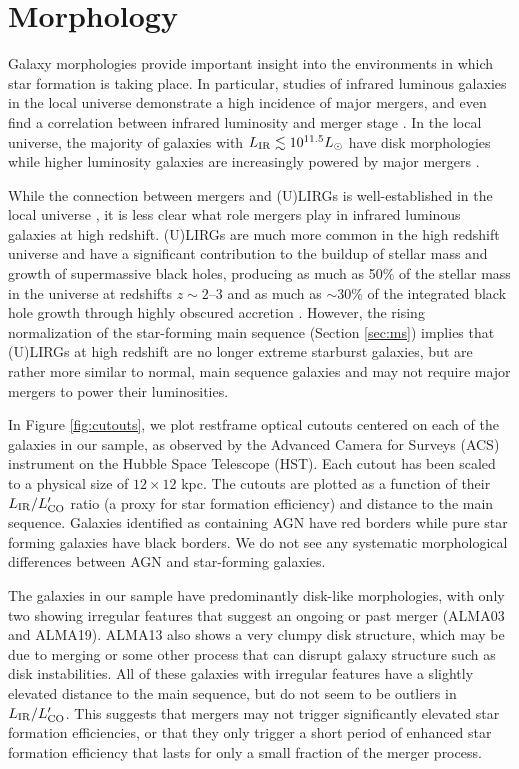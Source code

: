 \documentclass[a4paper,fleqn,usenatbib]{mnras}
\newcommand{\lir}{L_{\rm{IR}}}
\newcommand{\lco}{L'_{\rm{CO}}}
\begin{document}
\section{Morphology}\label{sec:morph}

Galaxy morphologies provide important insight into the environments in which star formation is taking place. In particular, studies of infrared luminous galaxies in the local universe demonstrate a high incidence of major mergers, and even find a correlation between infrared luminosity and merger stage \citep{2002ApJS..143..315V,2004PhDT........18I}. In the local universe, the majority of galaxies with $L_{\rm{IR}} \lesssim 10^{11.5} L_{\odot}$ have disk morphologies while higher luminosity galaxies are increasingly powered by major mergers \citep[e.g.][]{2010ApJ...721...98K,2011AJ....141..100H,2016ApJ...825..128L}.

While the connection between mergers and (U)LIRGs is well-established in the local universe \citep[e.g.][]{1996ARA&A..34..749S}, it is less clear what role mergers play in infrared luminous galaxies at high redshift. (U)LIRGs are much more common in the high redshift universe and have a significant contribution to the buildup of stellar mass and growth of supermassive black holes, producing as much as 50\% of the stellar mass in the universe at redshifts $z \sim 2$--3 \citep{2005ApJ...622..772C,2005ApJ...632..169L,2012ApJ...761..140C} and as much as $\sim 30$\% of the integrated black hole growth through highly obscured accretion \citep{2009ApJ...706..535T,2010ApJ...722L.238T}. However, the rising normalization of the star-forming main sequence (Section \ref{sec:ms}) implies that (U)LIRGs at high redshift are no longer extreme starburst galaxies, but are rather more similar to normal, main sequence galaxies and may not require major mergers to power their luminosities. 

In Figure \ref{fig:cutouts}, we plot restframe optical cutouts centered on each of the galaxies in our sample, as observed by the Advanced Camera for Surveys (ACS) instrument on the Hubble Space Telescope (HST). Each cutout has been scaled to a physical size of $12 \times 12$ kpc. The cutouts are plotted as a function of their $\lir / \lco$ ratio (a proxy for star formation efficiency) and distance to the main sequence. Galaxies identified as containing AGN have red borders while pure star forming galaxies have black borders. We do not see any systematic morphological differences between AGN and star-forming galaxies. 

The galaxies in our sample have predominantly disk-like morphologies, with only two showing irregular features that suggest an ongoing or past merger (ALMA03 and ALMA19). ALMA13 also shows a very clumpy disk structure, which may be due to merging or some other process that can disrupt galaxy structure such as disk instabilities.  All of these galaxies with irregular features have a slightly elevated distance to the main sequence, but do not seem to be outliers in $\lir / \lco$. This suggests that mergers may not trigger significantly elevated star formation efficiencies, or that they only trigger a short period of enhanced star formation efficiency that lasts for only a small fraction of the merger process. 
\end{document}
